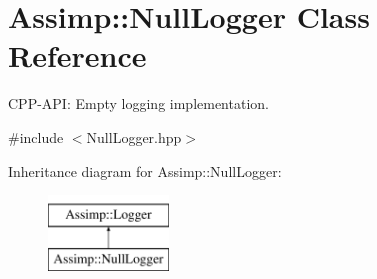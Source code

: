 \hypertarget{classAssimp_1_1NullLogger}{\section{\-Assimp\-:\-:\-Null\-Logger \-Class \-Reference}
\label{classAssimp_1_1NullLogger}
}


\-C\-P\-P-\/\-A\-P\-I\-: \-Empty logging implementation.  




{\ttfamily \#include $<$\-Null\-Logger.\-hpp$>$}

\-Inheritance diagram for \-Assimp\-:\-:\-Null\-Logger\-:\begin{figure}[H]
\begin{center}
\leavevmode
\includegraphics[height=2.000000cm]{classAssimp_1_1NullLogger}
\end{center}
\end{figure}
